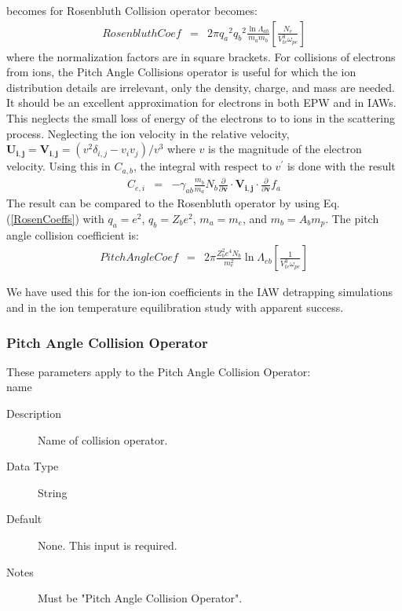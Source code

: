 \documentclass[11pt]{amsart}
\begin{document}
 becomes for Rosenbluth Collision operator becomes:
\begin{eqnarray}
\label{RosenCoeffs}
RosenbluthCoef & = & 2\pi {q_{a}}^{2}{q_{b}}^{2} \frac{\ln\varLambda_{ab}}{m_{a}m_{b}} \left [ \frac{N_e}{V_{te}^3 \omega_{pe}} \right ]
\end{eqnarray}
where the normalization factors are in square brackets. 
For collisions of electrons from ions, the Pitch Angle Collisions operator is
useful for which the ion distribution details are irrelevant, only the density,
charge, and mass are needed.  It should be an excellent approximation for
electrons in both EPW and in IAWs.  This neglects the small loss of energy of
the electrons to to ions in the scattering process. Neglecting the ion velocity
in the relative velocity, $ \boldsymbol{U_{i,j} } = \boldsymbol{ V_{i,j} } 
= (v^2 \delta_{i,j} - v_i v_j )/v^3  $
  where $v $ is the magnitude of the electron velocity.
 Using this in  $C_{a,b} $, the integral with respect to $v^{\prime} $ is done with the result
\begin{eqnarray}
C_{e,i}  & = & -  \gamma_{ab} \frac{m_{b} }{ m_{a}} N_b \frac{\partial}{\partial\boldsymbol{v}}  \cdot  \boldsymbol{ V_{i,j}}  \cdot \frac{\partial}{\partial\boldsymbol{v}} f_{a} 
\end{eqnarray}
 The result can be compared to the Rosenbluth operator by using Eq. (\ref{RosenCoeffs}) with $q_a =
 e^2$, $q_b = Z_b  e^2$, $m_a = m_e$, and $m_b= A_b m_p$. 
 The pitch angle collision coefficient is:
\begin{eqnarray}
PitchAngleCoef  & = & 2\pi \frac{Z_b^2 e^4 N_b}{m_e^2}  \ln\varLambda_{eb} \left [ \frac{1}{V_{te}^3 \omega_{pe}} \right ]
\end{eqnarray}

We have used this for the ion-ion coefficients in the IAW detrapping simulations
and in the ion temperature equilibration study with apparent success.

\subsubsection*{Pitch Angle Collision Operator}
These parameters apply to the Pitch Angle Collision Operator: \\
\indent name
\begin{description}
\item [Description] Name of collision operator.
\item [Data Type] String
\item [Default] None.  This input is required.
\item [Notes] Must be "Pitch Angle Collision Operator".
\end{description}
\end{document}
